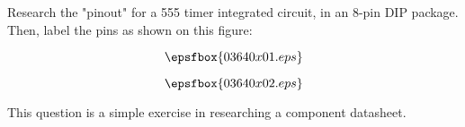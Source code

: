

Research the "pinout" for a 555 timer integrated circuit, in an 8-pin DIP package.  Then, label the pins as shown on this figure:

\vskip 10pt

$$\epsfbox{03640x01.eps}$$

\vskip 10pt







$$\epsfbox{03640x02.eps}$$







This question is a simple exercise in researching a component datasheet.




